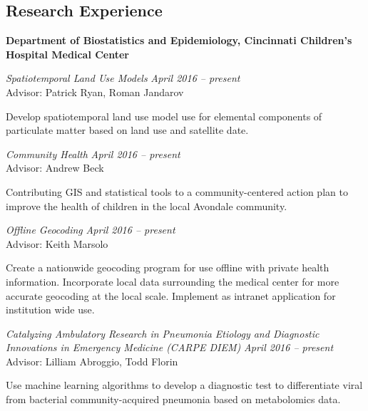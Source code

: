 \documentclass[margin,line]{res}
\newenvironment{list1}{
  \begin{list}{\ding{113}}{%
      \setlength{\itemsep}{0in}
      \setlength{\parsep}{0in} \setlength{\parskip}{0in}
      \setlength{\topsep}{0in} \setlength{\partopsep}{0in} 
      \setlength{\leftmargin}{0.17in}}}{\end{list}}
\begin{document}
\begin{resume}
\section{\sc Research Experience}

\textbf{Department of Biostatistics and Epidemiology, Cincinnati Children's Hospital Medical Center} \\

\vspace{-0.2in}

\textsl{Spatiotemporal Land Use Models}
\hfill \textit{April 2016 -- present} \\
Advisor: Patrick Ryan, Roman Jandarov\\
\vspace{-0.13in}
\begin{list1}
    \item[]Develop spatiotemporal land use model use for elemental components of particulate matter based on land use and satellite date.
\end{list1}

\textsl{Community Health}
\hfill \textit{April 2016 -- present} \\
Advisor: Andrew Beck\\
\vspace{-0.13in}
\begin{list1}
    \item[]Contributing GIS and statistical tools to a community-centered action plan to improve the health of children in the local Avondale community.
\end{list1}


\textsl{Offline Geocoding}
\hfill \textit{April 2016 -- present} \\
Advisor: Keith Marsolo\\
\vspace{-0.13in}
\begin{list1}
    \item[]Create a nationwide geocoding program for use offline with private health information.  Incorporate local data surrounding the medical center for more accurate geocoding at the local scale. Implement as intranet application for institution wide use.
\end{list1}

\textsl{Catalyzing Ambulatory Research in Pneumonia Etiology and Diagnostic Innovations in Emergency Medicine (CARPE DIEM)}
\hfill \textit{April 2016 -- present} \\
Advisor: Lilliam Abroggio, Todd Florin\\
\vspace{-0.13in}
\begin{list1}
    \item[]Use machine learning algorithms to develop a diagnostic test to differentiate viral from bacterial community-acquired pneumonia based on metabolomics data.
\end{list1}



\end{resume}
\end{document}
